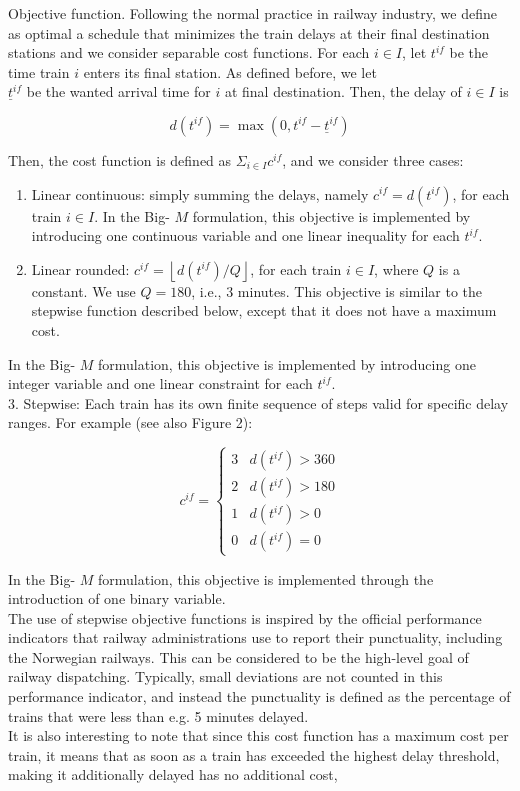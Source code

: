 \documentclass[10pt]{article}
\begin{document}
Objective function. Following the normal practice in railway industry, we define as optimal a schedule that minimizes the train delays at their final destination stations and we consider separable cost functions. For each $i \in I$, let $t^{i f}$ be the time train $i$ enters its final station. As defined before, we let\\
$\underline{t}^{i f}$ be the wanted arrival time for $i$ at final destination. Then, the delay of $i \in I$ is

$$
d\left(t^{i f}\right)=\max \left(0, t^{i f}-\underline{t}^{i f}\right)
$$

Then, the cost function is defined as $\Sigma_{i \in I} c^{i f}$, and we consider three cases:

\begin{enumerate}
  \item Linear continuous: simply summing the delays, namely $c^{i f}=d\left(t^{i f}\right)$, for each train $i \in I$. In the Big- $M$ formulation, this objective is implemented by introducing one continuous variable and one linear inequality for each $t^{i f}$.
  \item Linear rounded: $c^{i f}=\left\lfloor d\left(t^{i f}\right) / Q\right\rfloor$, for each train $i \in I$, where $Q$ is a constant. We use $Q=180$, i.e., 3 minutes. This objective is similar to the stepwise function described below, except that it does not have a maximum cost.
\end{enumerate}

In the Big- $M$ formulation, this objective is implemented by introducing one integer variable and one linear constraint for each $t^{i f}$.\\
3. Stepwise: Each train has its own finite sequence of steps valid for specific delay ranges. For example (see also Figure 2):

$$
c^{i f}= \begin{cases}3 & d\left(t^{i f}\right)>360 \\ 2 & d\left(t^{i f}\right)>180 \\ 1 & d\left(t^{i f}\right)>0 \\ 0 & d\left(t^{i f}\right)=0\end{cases}
$$

In the Big- $M$ formulation, this objective is implemented through the introduction of one binary variable.\\
The use of stepwise objective functions is inspired by the official performance indicators that railway administrations use to report their punctuality, including the Norwegian railways. This can be considered to be the high-level goal of railway dispatching. Typically, small deviations are not counted in this performance indicator, and instead the punctuality is defined as the percentage of trains that were less than e.g. 5 minutes delayed.\\
It is also interesting to note that since this cost function has a maximum cost per train, it means that as soon as a train has exceeded the highest delay threshold, making it additionally delayed has no additional cost,
\end{document}
